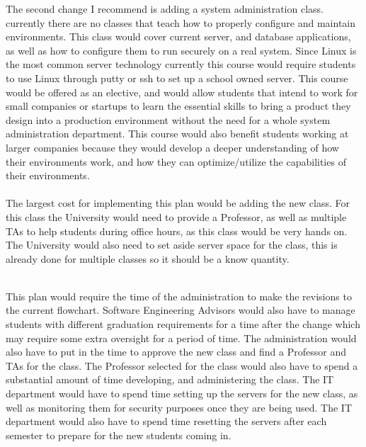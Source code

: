 \documentclass[11pt]{article}
\begin{document}
  \noindent The second change I recommend is adding a system administration class. currently there are no classes that teach how to properly configure and maintain
  environments. This class would cover current server, and database applications, as well as how to configure them to run securely on a real system. Since
  Linux is the most common server technology currently this course would require students to use Linux through putty or ssh to set up a school owned server.
  This course would be offered as an elective, and would allow students that intend to work for small companies or startups to learn the essential skills
  to bring a product they design into a production environment without the need for a whole system administration department. This course would also benefit
  students working at larger companies because they would develop a deeper understanding of how their environments work, and how they can optimize/utilize the
  capabilities of their environments.\\

  \\
  \noindent The largest cost for implementing this plan would be adding the new class. For this class the University would need to provide a Professor, as well as
  multiple TAs to help students during office hours, as this class would be very hands on. The University would also need to set aside server space for the class,
  this is already done for multiple classes so it should be a know quantity.\\

  \clearpage

  \\
  This plan would require the time of the administration to make the revisions to the current flowchart. Software Engineering Advisors would also
  have to manage students with different graduation requirements for a time after the change which may require some extra oversight for a period of time.
  The administration would also have to put in the time to approve the new class and find a Professor and TAs for the class. The Professor selected for the class
  would also have to spend a substantial amount of time developing, and administering the class. The IT department would have to spend time setting up the servers
  for the new class, as well as monitoring them for security purposes once they are being used. The IT department would also have to spend time resetting the
  servers after each semester to prepare for the new students coming in.\\
\end{document}
